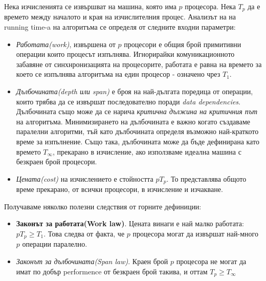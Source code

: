 \documentclass[11pt]{article} %
\begin{document}
Нека изчисленията се извършват на машина, която има $p$ процесора. Нека $T_{p}$ да е времето между началото и края на изчислителния процес. Анализът на на running time-a на алгоритъма се определя от следните входни параметри:
\begin{itemize}[noitemsep]
	\item \textit{Работата(work)}, извършена от $p$ процесори е общия брой примитивни операции които процесът изпълнява. Игнорирайки комуникационното забавяне от синхнронизацията на процесорите, работата е равна на времето за което се изпълнява алгоритъма на един процесор - означено чрез $T_{1}$.
	\item \textit{Дълбочината(depth или span)} е броя на най-дългата поредица от операции, които трябва да се извършат последователно поради \textit{data dependencies}. Дълбочината също може да се нарича \textit{критична дължина на критичния път} на алгоритъма. Минимизирането на дълбочината е важно когато създаваме паралелни алгоритми, тъй като дълбочината определя възможно най-краткото време за изпълнение. Също така, дълбочината може да бъде дефинирана като времето $T_{\infty}$, прекарано в изчисление, ако използваме идеална машина с безкраен брой процесори. 
	\item \textit{Цената(cost)} на изчислението е стойността $pT_{p}$. То представлява общото време прекарано, от всички процесори, в изчисление и изчакване.    
\end{itemize}  

Получаваме няколко полезни следствия от горните дефиниции:
\begin{itemize}[noitemsep]
	\item \textbf{Законът за работата(Work law)}. Цената винаги е най малко работата: $pT_{p}\geq T_{1}$. Това следва от факта, че $p$ процесора могат да извършат най-много $p$ операции паралелно.
	\item \textit{Законът за дълбочината(Span law)}. Краен брой $p$ процесора не могат да имат по добър performence от безкраен брой такива, и оттам $T_{p}\geq T_{\infty}$ 
\end{itemize}
\end{document}
